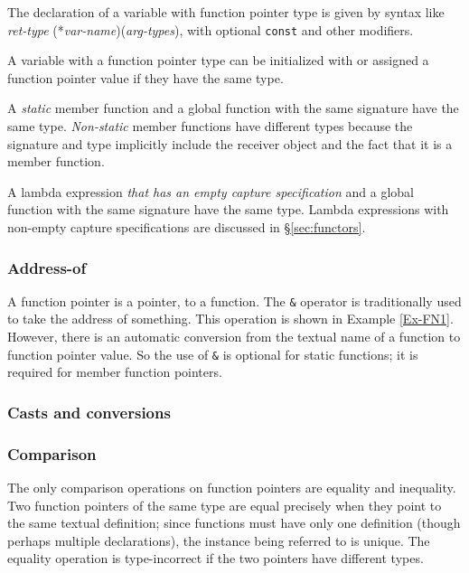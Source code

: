 The declaration of a variable with function pointer type is given by syntax like\\
\emph{ret-type} (*\emph{var-name})(\emph{arg-types}), with optional \lstinline|const| and other modifiers.

A variable with a function pointer type can be initialized with or assigned a function pointer value if they have the same type.

A \emph{static} member function and
a global function with the same signature have the same type.
\emph{Non-static} member functions have different types because
the signature and type implicitly include the receiver object
and the fact that it is a member function.

A lambda expression \emph{that has an empty capture specification} and
a global function with the same signature have the same type.
Lambda expressions with non-empty capture specifications are discussed 
in \S\ref{sec:functors}.

\subsubsection{Address-of}

A function pointer is a pointer, to a function. 
The \lstinline|&| operator is traditionally used to take
the address of something. 
This operation is shown in Example \ref{Ex-FN1}.
However, there is an automatic conversion from the textual
name of a function to function pointer value. 
So the use of \lstinline|&| is optional for static functions; it is required for member function pointers.

\subsubsection{Casts and conversions}


\subsubsection{Comparison}

The only comparison operations on function pointers are 
equality and inequality. Two function pointers of the 
same type are equal precisely when they point to the same
textual definition; since functions must have only one
definition (though perhaps multiple declarations), 
the instance being referred to is unique. 
The equality operation is type-incorrect if the two
pointers have different types.

